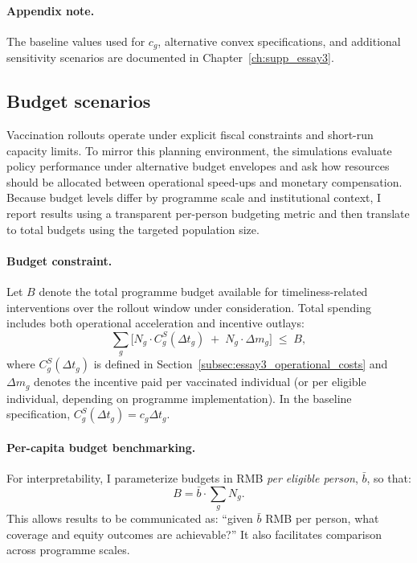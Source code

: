 \documentclass[doublespacing]{utdthesis}
\begin{document}
\paragraph{Appendix note.}
The baseline values used for $c_g$, alternative convex specifications, and additional sensitivity scenarios are documented in Chapter~\ref{ch:supp_essay3}.

\subsection{Budget scenarios}
\label{subsec:essay3_budget_scenarios}

Vaccination rollouts operate under explicit fiscal constraints and short-run capacity limits. To mirror this planning environment, the simulations evaluate policy performance under alternative budget envelopes and ask how resources should be allocated between operational speed-ups and monetary compensation. Because budget levels differ by programme scale and institutional context, I report results using a transparent per-person budgeting metric and then translate to total budgets using the targeted population size.

\paragraph{Budget constraint.}
Let $B$ denote the total programme budget available for timeliness-related interventions over the rollout window under consideration. Total spending includes both operational acceleration and incentive outlays:
\begin{equation}
\sum_{g} \Big[ N_g \cdot C^{S}_g(\Delta t_g) \;+\; N_g \cdot \Delta m_g \Big] \;\le\; B,
\label{eq:budget_constraint}
\end{equation}
where $C^{S}_g(\Delta t_g)$ is defined in Section~\ref{subsec:essay3_operational_costs} and $\Delta m_g$ denotes the incentive paid per vaccinated individual (or per eligible individual, depending on programme implementation). In the baseline specification, $C^{S}_g(\Delta t_g)=c_g \Delta t_g$.

\paragraph{Per-capita budget benchmarking.}
For interpretability, I parameterize budgets in RMB \emph{per eligible person}, $\bar{b}$, so that:
\begin{equation}
B = \bar{b}\cdot \sum_{g} N_g.
\end{equation}
This allows results to be communicated as: ``given $\bar{b}$ RMB per person, what coverage and equity outcomes are achievable?'' It also facilitates comparison across programme scales.
\end{document}
